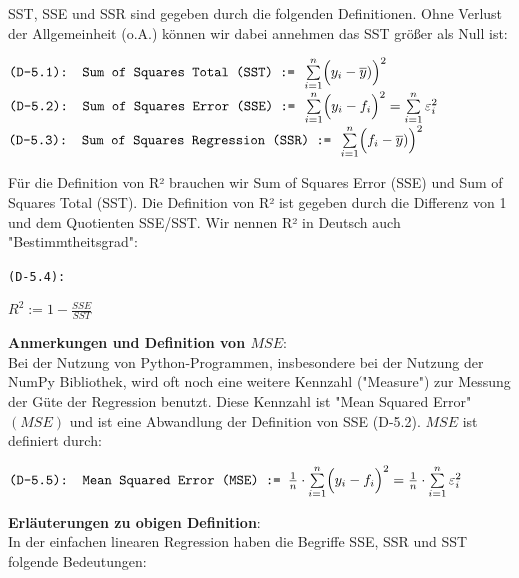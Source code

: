 \documentclass[12pt]{article}
\begin{document}
%
SST, SSE und SSR sind gegeben durch die folgenden Definitionen. Ohne Verlust der Allgemeinheit (o.A.) können wir dabei annehmen das SST größer als Null ist:
\begin{center}
$ \texttt{(D-5.1): Sum of Squares Total (SST) := } \sum\limits_{i=1}^n \Bigl(y_i - \overline{y})\Bigr)^2 $ 
$ \texttt{(D-5.2): Sum of Squares Error (SSE) := } \sum\limits_{i=1}^n \Bigl(y_i - f_i\Bigr)^2 = \sum\limits_{i=1}^n \varepsilon_i^2 $
$ \texttt{(D-5.3): Sum of Squares Regression (SSR) := } \sum\limits_{i=1}^n \Bigl(f_i - \overline{y})\Bigr)^2 $  
\end{center}
Für die Definition von R² brauchen wir Sum of Squares Error (SSE) und Sum of Squares Total (SST). Die Definition von R² ist gegeben durch die Differenz von 1 und dem Quotienten SSE/SST. Wir nennen R² in Deutsch auch "Bestimmtheitsgrad": \\
\begin{center}
\texttt{(D-5.4):}
\begin{Large}  
\textbf{$ R^2 := 1 - \frac{SSE}{SST} $} \\[0.8cm]
\end{Large}   
\end{center}
% 
\textbf{Anmerkungen und Definition von $MSE$}:\\[0.2cm]
Bei der Nutzung von Python-Programmen, insbesondere bei der Nutzung der NumPy Bibliothek, wird oft noch eine weitere Kennzahl ("Measure") zur Messung der Güte der Regression benutzt. Diese Kennzahl ist  "Mean Squared Error" $(MSE)$  und ist eine Abwandlung der Definition von SSE (D-5.2). $ MSE$ ist definiert durch:
\begin{center}
$ \texttt{(D-5.5): Mean Squared Error (MSE) := } \frac{1}{n} \cdot \sum\limits_{i=1}^n \Bigl( y_i - f_i \Bigr)^2 = \frac{1}{n} \cdot \sum\limits_{i=1}^n \varepsilon_i^2 $ \\
\end{center} 
%
\textbf{Erläuterungen zu obigen Definition}:\\[0.4 cm]
%
In der einfachen linearen Regression haben die Begriffe SSE, SSR und SST folgende Bedeutungen:
\end{document}
